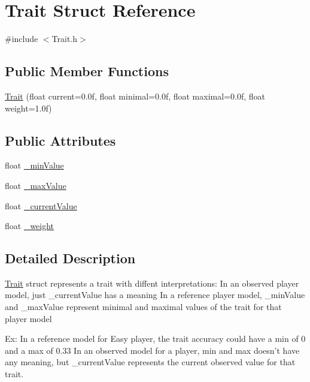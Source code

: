 \hypertarget{struct_trait}{
\section{Trait Struct Reference}
\label{d2/dab/struct_trait}
}


{\ttfamily \#include $<$Trait.h$>$}

\subsection*{Public Member Functions}
\begin{DoxyCompactItemize}
\item 
\hyperlink{struct_trait_aa90163722904e7d5fe18415cc2919c34}{Trait} (float current=0.0f, float minimal=0.0f, float maximal=0.0f, float weight=1.0f)
\end{DoxyCompactItemize}
\subsection*{Public Attributes}
\begin{DoxyCompactItemize}
\item 
float \hyperlink{struct_trait_a1b41aeaad4c3eb2a9fa6dc2c7b01add4}{\_\-minValue}
\item 
float \hyperlink{struct_trait_aac03d70d4f669f36d8aaf40747df42fe}{\_\-maxValue}
\item 
float \hyperlink{struct_trait_ad3edb188a38caca17a4a947be9667f04}{\_\-currentValue}
\item 
float \hyperlink{struct_trait_a53d78764a07dd12fa421ddac0f198d34}{\_\-weight}
\end{DoxyCompactItemize}


\subsection{Detailed Description}
\hyperlink{struct_trait}{Trait} struct represents a trait with diffent interpretations: In an observed player model, just \_\-currentValue has a meaning In a reference player model, \_\-minValue and \_\-maxValue represent minimal and maximal values of the trait for that player model

Ex: In a reference model for Easy player, the trait accuracy could have a min of 0 and a max of 0.33 In an observed model for a player, min and max doesn't have any meaning, but \_\-currentValue represents the current observed value for that trait. 

